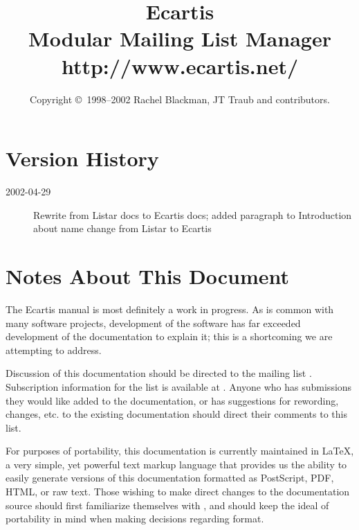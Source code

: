 \documentclass{book}
\begin{document}
\frontmatter

\title{Ecartis \\ Modular Mailing List Manager \\ http://www.ecartis.net/}
\author{Copyright \copyright\ 1998--2002 Rachel Blackman, JT Traub and contributors.}
\maketitle

\chapter{Version History}
\label{version}

\begin{description}
	\item[2002-04-29] Rewrite from Listar docs to Ecartis docs; added
                      paragraph to Introduction about name change from Listar
                      to Ecartis
\end{description}

\chapter{Notes About This Document}

The Ecartis manual is most definitely a work in progress.  As is common with
many software projects, development of the software has far exceeded
development of the documentation to explain it; this is a shortcoming we are
attempting to address.  

Discussion of this documentation should be directed to the mailing list 
.  Subscription information for the list is
available at .  Anyone who has submissions they
would like added to the documentation, or has suggestions for rewording,
changes, etc. to the existing documentation should direct their comments to
this list.

For purposes of portability, this documentation is currently maintained in
\LaTeX, a very simple, yet powerful text markup language that provides us the
ability to easily generate versions of this documentation formatted as
PostScript, PDF, HTML, or raw text.  Those wishing to make direct changes to
the documentation source should first familiarize themselves with \LaTeXe,
and should keep the ideal of portability in mind when making decisions
regarding format.
\end{document}
